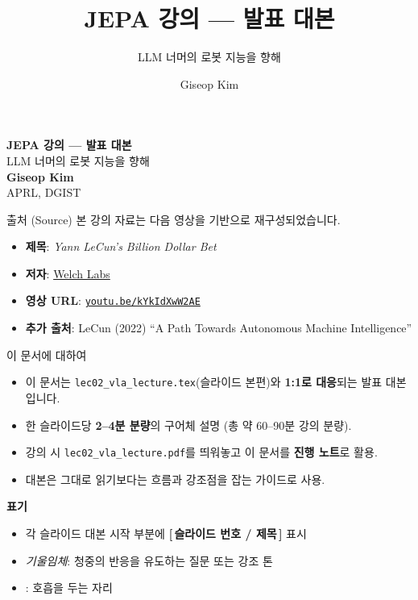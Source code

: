 \documentclass[aspectratio=169,10pt]{beamer}
\title{JEPA 강의 --- 발표 대본}
\subtitle{LLM 너머의 로봇 지능을 향해}
\author{Giseop Kim}
\institute{APRL, DGIST}
\date{}
\begin{document}
{
\begin{frame}[plain]
\vspace*{0.8cm}
\begin{center}
{\LARGE\textbf{JEPA 강의 --- 발표 대본}}\\[0.3cm]
{\large LLM 너머의 로봇 지능을 향해}\\[0.8cm]
\textbf{Giseop Kim}\\[0.15cm]
{\small APRL, DGIST}
\end{center}

\vspace{0.8cm}
\begin{block}{출처 (Source)}
본 강의 자료는 다음 영상을 기반으로 재구성되었습니다.
\begin{itemize}
  \footnotesize
  \item \textbf{제목}: \textit{Yann LeCun's Billion Dollar Bet}
  \item \textbf{저자}: \href{https://www.youtube.com/@WelchLabs}{Welch Labs}
  \item \textbf{영상 URL}: \href{https://youtu.be/kYkIdXwW2AE?si=asUnIL7EKPRMRwDp}{\texttt{youtu.be/kYkIdXwW2AE}}
  \item \textbf{추가 출처}: LeCun (2022) ``A Path Towards Autonomous Machine Intelligence''
\end{itemize}
\end{block}
\end{frame}
}

\begin{frame}{이 문서에 대하여}
\begin{itemize}
  \item 이 문서는 \texttt{lec02\_vla\_lecture.tex}(슬라이드 본편)와 \textbf{1:1로 대응}되는 발표 대본입니다.
  \item 한 슬라이드당 \textbf{2--4분 분량}의 구어체 설명 (총 약 60--90분 강의 분량).
  \item 강의 시 \texttt{lec02\_vla\_lecture.pdf}를 띄워놓고 이 문서를 \textbf{진행 노트}로 활용.
  \item 대본은 그대로 읽기보다는 \alert{흐름과 강조점을 잡는 가이드}로 사용.
\end{itemize}

\vspace{0.8em}
\textbf{표기}
\begin{itemize}
  \item 각 슬라이드 대본 시작 부분에 \textbf{[\,슬라이드 번호 / 제목\,]} 표시
  \item \textit{기울임체}: 청중의 반응을 유도하는 질문 또는 강조 톤
  \item [말줄임]: 호흡을 두는 자리
\end{itemize}
\end{frame}
\end{document}
